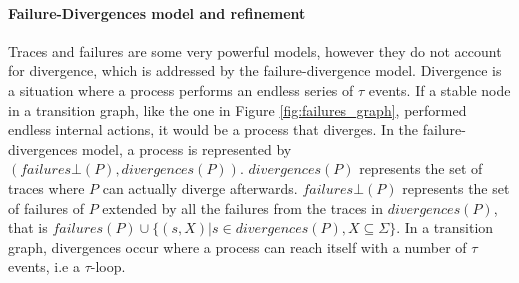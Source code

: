 \paragraph{Failure-Divergences model and refinement}
Traces and failures are some very powerful models, however they do not account for divergence, which is addressed by the failure-divergence model. Divergence is a situation where a process performs an endless series of $\tau$ events. If a stable node in a transition graph, like the one in Figure \ref{fig:failures_graph}, performed endless internal actions, it would be a process that diverges. In the failure-divergences model, a process is represented by $(failures\bot(P), divergences(P))$. $divergences(P)$ represents the set of traces where $P$ can actually diverge afterwards. $failures\bot(P)$ represents the set of failures of $P$ extended by all the failures from the traces in $divergences(P)$, that is $failures(P) \cup \{(s,X) | s \in divergences(P), X \subseteq \Sigma\}$.
In a transition graph, divergences occur where a process can reach itself with a number of $\tau$ events, i.e a $\tau$-loop.





